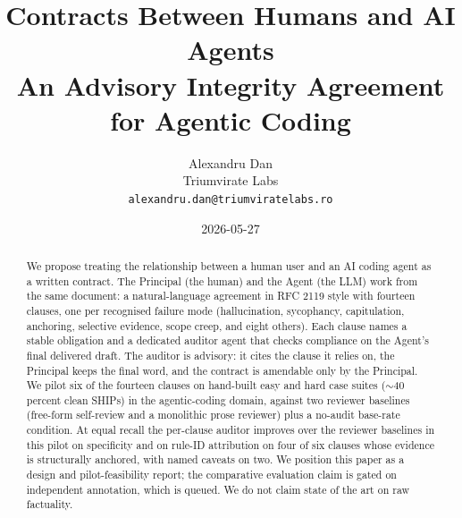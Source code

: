 \documentclass[10pt,letterpaper]{article}
\title{
  \LARGE \textbf{Contracts Between Humans and AI Agents} \\[0.4em]
  \large An Advisory Integrity Agreement for Agentic Coding
}
\author{
  Alexandru Dan \\
  Triumvirate Labs \\
  \texttt{alexandru.dan@triumviratelabs.ro}
}
\date{2026-05-27}
\begin{document}
\maketitle

\begin{abstract}
We propose treating the relationship between a human user and an AI coding
agent as a written contract. The Principal (the human) and the Agent (the LLM)
work from the same document: a natural-language agreement in RFC 2119 style
with fourteen clauses, one per recognised failure mode (hallucination,
sycophancy, capitulation, anchoring, selective evidence, scope creep, and
eight others). Each clause names a stable obligation and a dedicated auditor
agent that checks compliance on the Agent's final delivered draft. The
auditor is advisory: it cites the clause it relies on, the Principal keeps
the final word, and the contract is amendable only by the Principal. We
pilot six of the fourteen clauses on hand-built easy and hard case suites
($\sim$40 percent clean SHIPs) in the agentic-coding domain, against two
reviewer baselines (free-form self-review and a monolithic prose reviewer)
plus a no-audit base-rate condition. At equal recall the per-clause auditor
improves over the reviewer baselines in this pilot on specificity and on
rule-ID attribution on four of six clauses whose evidence is structurally
anchored, with named caveats on two. We position this paper as a design and
pilot-feasibility report; the comparative evaluation claim is gated on
independent annotation, which is queued. We do not claim state of the art on
raw factuality.
\end{abstract}


\end{document}
